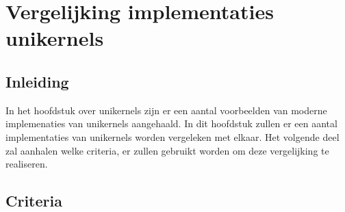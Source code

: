 \chapter{Vergelijking implementaties unikernels}
\label{ch:vergelijking-unikernels}

\section{Inleiding}

In het hoofdstuk over unikernels zijn er een aantal voorbeelden van moderne implemenaties van unikernels aangehaald. In dit hoofdstuk zullen er een aantal implementaties van unikernels worden vergeleken met elkaar. Het volgende deel zal aanhalen welke criteria, er zullen gebruikt worden om deze vergelijking te realiseren.

\section{Criteria}

